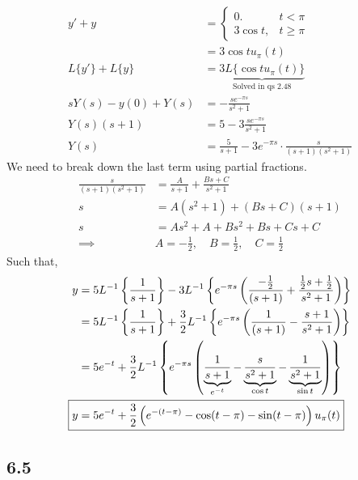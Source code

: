 \documentclass{article}
\begin{document}
\begin{align*}
  y' + y &= \left\{\begin{array}{cc}0 . & t<\pi \\ 3 \cos t, & t \geq \pi\end{array}\right. \\
  &= 3 \cos t u_{\pi}(t) \\
  L\{y'\} + L\{y\} &= \underbrace{3L\{\cos t u_{\pi}(t)\}}_{\text{Solved in qs 2.48}} \\
  sY(s) - y(0) + Y(s) &= -\frac{se^{-\pi s}}{s^2 + 1} \\
  Y(s) (s+1)& = 5 - 3\frac{se^{-\pi s}}{s^2 + 1} \\
  Y(s) &= \frac{5}{s+1} - 3 e^{-\pi s} \cdot \frac{s}{(s+1)(s^2 + 1)}
\end{align*}
We need to break down the last term using partial fractions.
\begin{align*}
  \frac{s}{(s+1)(s^2 + 1)} &= \frac{A}{s+1} + \frac{Bs+C}{s^2+1} \\
  s &= A(s^2+1) + (Bs+C)(s+1) \\
  s &= As^2 + A + Bs^2 + Bs + Cs + C \\
  \implies & A = -\frac{1}{2}, \quad B = \frac{1}{2}, \quad C = \frac{1}{2}
\end{align*}
Such that,
\begin{align*}
  y &= 5 L^{-1} \left\{\frac{1}{s+1}\right\} - 3 L^{-1} \left\{ e^{-\pi s} \left(\frac{-\frac{1}{2}}{(s+1)} + \frac{\frac{1}{2}s + \frac{1}{2}}{s^2+1} \right) \right\} \\
  &= 5 L^{-1} \left\{\frac{1}{s+1}\right\} + \frac{3}{2} L^{-1} \left\{ e^{-\pi s} \left(\frac{1}{(s+1)} - \frac{s + 1}{s^2+1} \right) \right\} \\
  &= 5 e^{-t} + \frac{3}{2} L^{-1} \left\{ e^{-\pi s} \left( \underbrace{\frac{1}{s+1}}_{e^{-t}} - \underbrace{\frac{s}{s^2+1}}_{\cos t} - \underbrace{\frac{1}{s^2 +1}}_{\sin t} \right) \right\} \\
  \Aboxed{y &= 5 e^{-t} + \frac{3}{2} \left( e^{-(t-\pi)} - \cos(t-\pi) - \sin(t-\pi) \right) u_{\pi} (t)}
\end{align*}


\subsection*{6.5}
\end{document}
